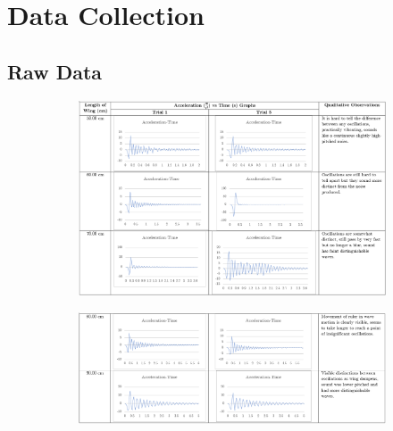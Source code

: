 \documentclass[12pt]{article}
\begin{document}
\section{Data Collection}

\subsection{Raw Data}

\begin{figure}[H]
     \centering
     \caption{Representative sample of the raw data as graphs generated by LoggerPro showing 2/7 trials of the model plane wing lengths (50.00 cm, 60.00 cm, 70.00 cm, 80.00 cm, 90.00 cm) and their acceleration-time graphs with qualitative observations.}
     \begin{subfigure}[b]{\textwidth}
         \centering
         \includegraphics[width=\textwidth]{images/raw1.png}
     \end{subfigure}
     \hfill
     \begin{subfigure}[b]{\textwidth}
         \centering
         \includegraphics[width=\textwidth]{images/raw 2.png}
     \end{subfigure}
     \hfill
    \label{fig:raww}
\end{figure}
\end{document}
